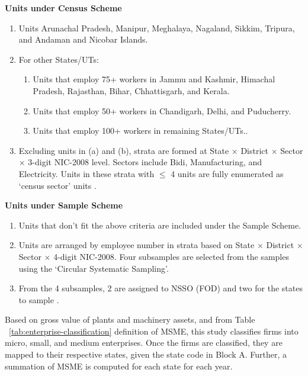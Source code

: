 \documentclass [12pt]{article}
\begin{document}
\vspace{1cm}

\noindent\textbf{{Units under Census Scheme}}
\begin{enumerate}
  \item Units Arunachal Pradesh, Manipur, Meghalaya, Nagaland, Sikkim, Tripura, and Andaman and Nicobar Islands.
  \item For other States/UTs:
    \begin{enumerate}
      \item Units that employ 75+ workers in Jammu and Kashmir, Himachal Pradesh, Rajasthan, Bihar, Chhattisgarh, and Kerala.
      \item Units that employ 50+ workers in Chandigarh, Delhi, and Puducherry.
      \item Units that employ 100+ workers in remaining States/UTs..
    \end{enumerate}
  \item Excluding units in (a) and (b), strata are formed at State $\times$ District $\times$ Sector $\times$ 3-digit NIC-2008 level. Sectors include Bidi, Manufacturing, and Electricity. Units in these strata with $\leq$ 4 units are fully enumerated as ‘census sector’ units \parencite{labourbureau2018annual}.
  \end{enumerate}

\noindent\textbf{{Units under Sample Scheme}}

  \begin{enumerate}
        \item Units that don't fit the above criteria are included under the Sample Scheme. 
        \item Units are arranged by employee number in strata based on State $\times$ District $\times$ Sector $\times$ 4-digit NIC-2008. Four subsamples are selected from the samples using the `Circular Systematic Sampling'.
  \item From the 4 subsamples, 2 are assigned to NSSO (FOD) and two for the states to sample \parencite{labourbureau2018annual}.
\end{enumerate}

\text Based on gross value of plants and machinery assets, and from Table ~\ref{tab:enterprise-classification} definition of MSME, this study classifies firms into micro, small, and medium enterprises. Once the firms are classified, they are mapped to their respective states, given the state code in Block A. Further, a summation of MSME is computed for each state for each year. 
\end{document}
